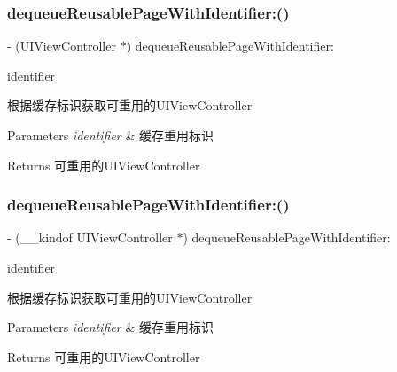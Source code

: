 \subsubsection{\texorpdfstring{dequeue\+Reusable\+Page\+With\+Identifier\+:()}{dequeueReusablePageWithIdentifier:()}\hspace{0.1cm}{\footnotesize\ttfamily [1/3]}}
{\footnotesize\ttfamily -\/ (U\+I\+View\+Controller $\ast$) dequeue\+Reusable\+Page\+With\+Identifier\+: \begin{DoxyParamCaption}\item[{(N\+S\+String $\ast$)}]{identifier }\end{DoxyParamCaption}}

根据缓存标识获取可重用的\+U\+I\+View\+Controller


\begin{DoxyParams}{Parameters}
{\em identifier} & 缓存重用标识\\
\hline
\end{DoxyParams}
\begin{DoxyReturn}{Returns}
可重用的\+U\+I\+View\+Controller 
\end{DoxyReturn}
\mbox{\label{interface_v_t_magic_view_a55eb4a83b49a1689761adba0d2596685}} 
\subsubsection{\texorpdfstring{dequeue\+Reusable\+Page\+With\+Identifier\+:()}{dequeueReusablePageWithIdentifier:()}\hspace{0.1cm}{\footnotesize\ttfamily [2/3]}}
{\footnotesize\ttfamily -\/ (\+\_\+\+\_\+kindof U\+I\+View\+Controller $\ast$) dequeue\+Reusable\+Page\+With\+Identifier\+: \begin{DoxyParamCaption}\item[{(N\+S\+String $\ast$)}]{identifier }\end{DoxyParamCaption}}

根据缓存标识获取可重用的\+U\+I\+View\+Controller


\begin{DoxyParams}{Parameters}
{\em identifier} & 缓存重用标识\\
\hline
\end{DoxyParams}
\begin{DoxyReturn}{Returns}
可重用的\+U\+I\+View\+Controller 
\end{DoxyReturn}
\mbox{\label{interface_v_t_magic_view_a55eb4a83b49a1689761adba0d2596685}} 
